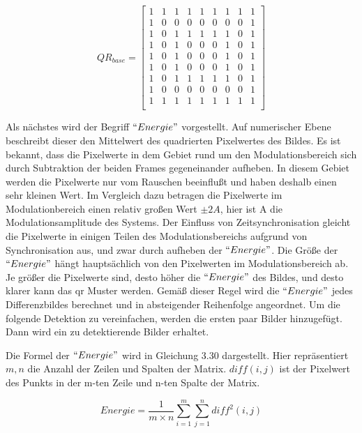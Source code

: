 \begin{equation}
QR_{base} = \begin{bmatrix}
    1 &1 &1 &1 &1 &1 &1 &1 &1 \\
    1 &0 &0 &0 &0 &0 &0 &0 &1 \\
    1 &0 &1 &1 &1 &1 &1 &0 &1 \\ 
    1 &0 &1 &0 &0 &0 &1 &0 &1 \\ 
    1 &0 &1 &0 &0 &0 &1 &0 &1 \\ 
    1 &0 &1 &0 &0 &0 &1 &0 &1 \\ 
    1 &0 &1 &1 &1 &1 &1 &0 &1 \\ 
    1 &0 &0 &0 &0 &0 &0 &0 &1 \\ 
    1 &1 &1 &1 &1 &1 &1 &1 &1 \\ 
\end{bmatrix}
\end{equation}

Als nächstes wird der Begriff $``Energie"$ vorgestellt. Auf numerischer Ebene beschreibt dieser den Mittelwert des quadrierten Pixelwertes des Bildes. Es ist bekannt, dass die Pixelwerte in dem Gebiet rund um den Modulationsbereich sich durch Subtraktion der beiden Frames gegeneinander aufheben. In diesem Gebiet werden die Pixelwerte nur vom Rauschen beeinflußt und haben deshalb einen sehr kleinen Wert. Im Vergleich dazu betragen die Pixelwerte im Modulationbereich einen relativ großen Wert $\pm2A$, hier ist A die Modulationsamplitude des Systems. Der Einfluss von Zeitsynchronisation gleicht die Pixelwerte in einigen Teilen des Modulationsbereichs aufgrund von Synchronisation aus, und zwar durch aufheben der $ ``Energie" $. Die Größe der $``Energie"$ hängt hauptsächlich von den Pixelwerten im Modulationsbereich ab. Je größer die Pixelwerte sind, desto höher die $``Energie"$ des Bildes, und desto klarer kann das \gls{qr} Muster werden. Gemäß dieser Regel wird die $``Energie"$ jedes Differenzbildes berechnet und in absteigender Reihenfolge angeordnet. Um die folgende Detektion zu vereinfachen, werden die ersten paar Bilder hinzugefügt. Dann wird ein zu detektierende Bilder erhaltet. %

Die Formel der $``Energie"$ wird in Gleichung 3.30 dargestellt. Hier repräsentiert $ m,n $ die Anzahl der Zeilen und Spalten der Matrix. $diff(i,j)$ ist der Pixelwert des Punkts in der m-ten Zeile und n-ten Spalte der Matrix.

\begin{equation}
Energie = \frac{1}{m \times n} \sum_{i=1}^m \sum_{j=1}^n diff^2(i,j) 
\end{equation}


